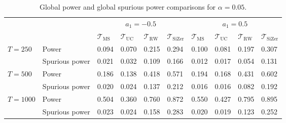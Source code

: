\begin{table}[t!]
\footnotesize{
\caption{Global power and global spurious power comparisons for $\alpha=0.05$.}\label{tab:sim:power:bump}
\begin{tabularx}{\textwidth}{l@{\hskip 15pt} l@{\hskip 15pt} Z@{\hskip 6pt}Z@{\hskip 6pt}Z@{\hskip 6pt}Z@{\hskip 15pt}Z@{\hskip 6pt}Z@{\hskip 6pt}Z@{\hskip 6pt}Z}
\toprule
 & &  &  \\
 & & $\mathcal{T}_{\text{MS}}$ & $\mathcal{T}_{\text{UC}}$ & $\mathcal{T}_{\text{RW}}$ & $\mathcal{T}_{\text{SiZer}}$ & $\mathcal{T}_{\text{MS}}$ & $\mathcal{T}_{\text{UC}}$ & $\mathcal{T}_{\text{RW}}$ & $\mathcal{T}_{\text{SiZer}}$ \\
$T=250$  & Power          &  0.094 & 0.070 & 0.215 & 0.294  & 0.100 & 0.081 & 0.197 & 0.307 \\ 
         & Spurious power &  0.021 & 0.032 & 0.109 & 0.166  & 0.012 & 0.017 & 0.054 & 0.131 \\[0.05cm] 
$T=500$  & Power          &  0.186 & 0.138 & 0.418 & 0.571  & 0.194 & 0.168 & 0.431 & 0.602 \\ 
         & Spurious power &  0.020 & 0.024 & 0.137 & 0.212  & 0.016 & 0.016 & 0.082 & 0.192 \\[0.05cm] 
$T=1000$ & Power          &  0.504 & 0.360 & 0.760 & 0.872  & 0.550 & 0.427 & 0.795 & 0.895 \\ 
         & Spurious power &  0.023 & 0.024 & 0.158 & 0.283  & 0.020 & 0.019 & 0.123 & 0.252 \\ 
\bottomrule
\end{tabularx}}
\vspace{0.2cm}
\end{table}


